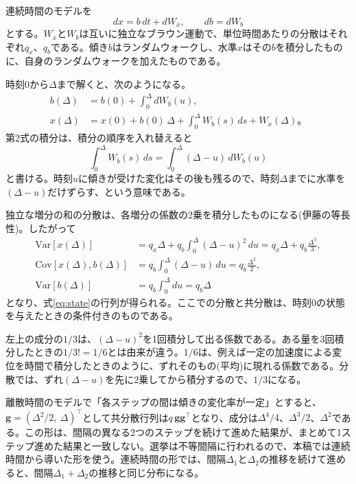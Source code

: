 \documentclass[a4paper,11pt]{ltjsarticle}
\begin{document}
連続時間のモデルを
\begin{equation}
  dx = b\,dt + dW_x, \qquad db = dW_b
\end{equation}
とする。$W_x$と$W_b$は互いに独立なブラウン運動で、単位時間あたりの分散はそれぞれ$q_x$、$q_b$である。傾き$b$はランダムウォークし、水準$x$はその$b$を積分したものに、自身のランダムウォークを加えたものである。

時刻$0$から$\Delta$まで解くと、次のようになる。
\begin{align}
  b(\Delta) &= b(0) + \int_0^\Delta dW_b(u), \\
  x(\Delta) &= x(0) + b(0)\,\Delta + \int_0^\Delta W_b(s)\,ds + W_x(\Delta)。
\end{align}
第2式の積分は、積分の順序を入れ替えると
\begin{equation}
  \int_0^\Delta W_b(s)\,ds = \int_0^\Delta (\Delta-u)\,dW_b(u)
\end{equation}
と書ける。時刻$u$に傾きが受けた変化はその後も残るので、時刻$\Delta$までに水準を$(\Delta-u)$だけずらす、という意味である。

独立な増分の和の分散は、各増分の係数の2乗を積分したものになる(伊藤の等長性)。したがって
\begin{align}
  \mathrm{Var}[x(\Delta)] &= q_x\Delta + q_b\int_0^\Delta (\Delta-u)^2\,du = q_x\Delta + q_b\frac{\Delta^3}{3}, \\
  \mathrm{Cov}[x(\Delta), b(\Delta)] &= q_b\int_0^\Delta (\Delta-u)\,du = q_b\frac{\Delta^2}{2}, \\
  \mathrm{Var}[b(\Delta)] &= q_b\int_0^\Delta du = q_b\Delta
\end{align}
となり、式\eqref{eq:state}の行列が得られる。ここでの分散と共分散は、時刻$0$の状態を与えたときの条件付きのものである。

左上の成分の$1/3$は、$(\Delta-u)^2$を1回積分して出る係数である。ある量を3回積分したときの$1/3!=1/6$とは由来が違う。$1/6$は、例えば一定の加速度による変位を時間で積分したときのように、ずれそのもの(平均)に現れる係数である。分散では、ずれ$(\Delta-u)$を先に2乗してから積分するので、$1/3$になる。

離散時間のモデルで「各ステップの間は傾きの変化率が一定」とすると、$\boldsymbol{g}=(\Delta^2/2,\ \Delta)^\top$として共分散行列は$q\,\boldsymbol{g}\boldsymbol{g}^\top$となり、成分は$\Delta^4/4$、$\Delta^3/2$、$\Delta^2$である。この形は、間隔の異なる2つのステップを続けて進めた結果が、まとめて1ステップ進めた結果と一致しない。選挙は不等間隔に行われるので、本稿では連続時間から導いた形を使う。連続時間の形では、間隔$\Delta_1$と$\Delta_2$の推移を続けて進めると、間隔$\Delta_1+\Delta_2$の推移と同じ分布になる。
\end{document}
